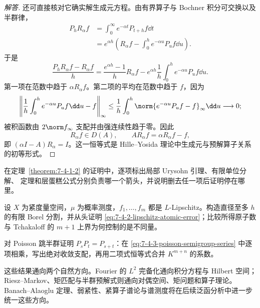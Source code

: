 \begin{proof}[解答]
还可直接核对它确实解生成元方程。由有界算子与 Bochner 积分可交换以及半群律，
\begin{align*}
 P_hR_\alpha f
 &=\int_0^\infty e^{-\alpha t}P_{t+h}f\dd t\\
 &=e^{\alpha h}\left(R_\alpha f-
   \int_0^he^{-\alpha u}P_uf\dd u\right).
\end{align*}
于是
\[
 \frac{P_hR_\alpha f-R_\alpha f}{h}
 =\frac{e^{\alpha h}-1}{h}R_\alpha f
 -e^{\alpha h}\frac1h\int_0^he^{-\alpha u}P_uf\dd u.
\]
第一项在范数中趋于 $\alpha R_\alpha f$。第二项的平均在范数中趋于 $f$，因为
\[
 \left\|\frac1h\int_0^he^{-\alpha u}P_uf\dd u-f\right\|_\infty
 \le\frac1h\int_0^h\norm{e^{-\alpha u}P_uf-f}_\infty\dd u\longrightarrow0;
\]
被积函数由 $2\norm f_\infty$ 支配并由强连续性趋于零。因此
\[
 R_\alpha f\in D(A),\qquad
 AR_\alpha f=\alpha R_\alpha f-f,
\]
即 $(\alpha I-A)R_\alpha=I$。这一恒等式是 Hille--Yosida 理论中生成元与预解算子关系的初等形式。
\end{proof}

\begin{exercise}
在定理~\ref{theorem:7-4-1-2} 的证明中，逐项标出局部 Urysohn 引理、有限单位分解、
\Caratheodory{} 定理和层蛋糕公式分别负责哪一个箭头，并说明删去任一项后证明停在哪里。
\end{exercise}

\begin{exercise}
设 $X$ 为紧度量空间，$\mu$ 为概率测度，$f_1,\ldots,f_m$ 都是 $L$-Lipschitz。构造直径至多 $h$
的有限 Borel 分割，并从头证明 \eqref{eq:7-4-2-lipschitz-atomic-error}；比较所得原子数与
Tchakaloff 的 $m+1$ 上界为何控制的是不同量。
\end{exercise}

\begin{exercise}
对 Poisson 跳半群证明 $P_sP_t=P_{s+t}$：在
\eqref{eq:7-4-3-poisson-semigroup-series} 中逐项相乘，写出绝对收敛支配，再用二项式恒等式合并
$K^{m+n}$ 的系数。
\end{exercise}

这些结果通向两个自然方向。Fourier 的 $L^2$ 完备化通向积分方程与 Hilbert 空间；
Riesz--Markov、矩匹配与半群预解式则通向对偶空间、矩问题和算子理论。Banach--Alaoglu
定理、弱紧性、紧算子谱论与谱测度将在后续泛函分析中进一步统一这些方向。

